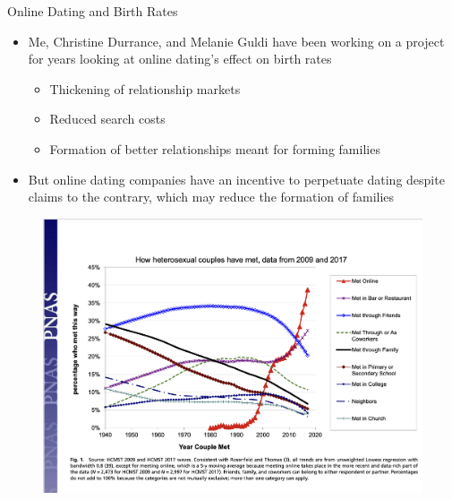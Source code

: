 \documentclass{beamer}
\begin{document}
\begin{frame}{Online Dating and Birth Rates}

\begin{itemize}
\item Me, Christine Durrance, and Melanie Guldi have been working on a project for years looking at online dating's effect on birth rates
	\begin{itemize}
	\item Thickening of relationship markets
	\item Reduced search costs
	\item Formation of better relationships meant for forming families
	\end{itemize}
\item But online dating companies have an incentive to perpetuate dating despite claims to the contrary, which may reduce the formation of families
\end{itemize}
\end{frame}


\begin{frame}

\begin{figure}
    \centering
    \includegraphics[height=0.85\textheight]{./lecture_includes/online_dating}
\end{figure}

\end{frame}
\end{document}

